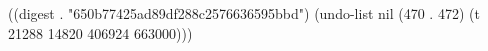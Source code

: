 
((digest . "650b77425ad89df288c2576636595bbd") (undo-list nil (470 . 472) (t 21288 14820 406924 663000)))
